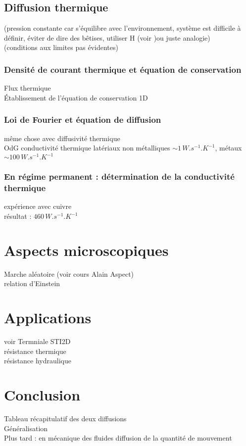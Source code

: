 \subsection{Diffusion thermique}
(pression constante car s'équilibre avec l'environnement, système est difficile à définir, éviter de dire des bêtises, utiliser H (voir \cite{Diu_thermo})ou juste analogie) \\
(conditions aux limites pas évidentes) \\

\subsubsection{Densité de courant thermique et équation de conservation}
Flux thermique \\
Établissement de l'équation de conservation 1D \\
\subsubsection{Loi de Fourier et équation de diffusion}
même chose avec diffusivité thermique \\
OdG conductivité thermique latériaux non métalliques $\sim 1\,W.s^{-1}.K^{-1}$, métaux $\sim 100\,W.s^{-1}.K^{-1}$
\subsubsection{En régime permanent : détermination de la conductivité thermique}
expérience avec cuivre \\
résultat : $460\,W.s^{-1}.K^{-1}$

\section{Aspects microscopiques}
Marche aléatoire (voir cours Alain Aspect) \\
relation d'Einstein \\

\section{Applications}
voir Termniale STI2D \\
résistance thermique \\
résistance hydraulique \\

\section*{Conclusion}
Tableau récapitulatif des deux diffusions \\
Généralisation \\
Plus tard : en mécanique des fluides diffusion de la quantité de mouvement \\



